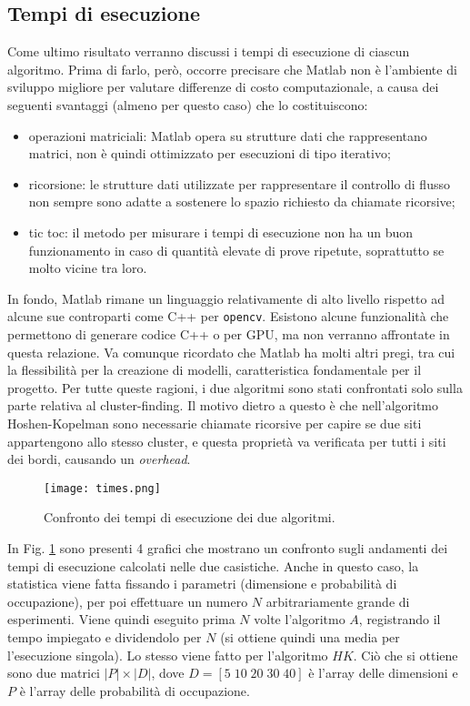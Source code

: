 \subsection*{Tempi di esecuzione}
Come ultimo risultato verranno discussi i tempi di esecuzione di ciascun algoritmo.
Prima di farlo, però, occorre precisare che Matlab non è l'ambiente di sviluppo migliore per valutare 
differenze di costo computazionale, a causa dei seguenti svantaggi (almeno per questo caso) che lo costituiscono:
\begin{itemize}
    \item operazioni matriciali: Matlab opera su strutture dati che rappresentano matrici,
        non è quindi ottimizzato per esecuzioni di tipo iterativo;
    \item ricorsione: le strutture dati utilizzate per 
        rappresentare il controllo di flusso non sempre sono adatte a sostenere lo spazio 
        richiesto da chiamate ricorsive;
    \item tic toc: il metodo per misurare i tempi di esecuzione non ha un buon funzionamento 
        in caso di quantità elevate di prove ripetute, soprattutto se molto vicine tra loro.
\end{itemize}
In fondo, Matlab rimane un linguaggio relativamente di alto livello rispetto 
ad alcune sue controparti come C++ per \texttt{opencv}.
Esistono alcune funzionalità che permettono di generare codice C++ o per GPU, ma non verranno affrontate in questa relazione.
Va comunque ricordato che Matlab ha molti altri pregi, tra cui la flessibilità
per la creazione di modelli, caratteristica fondamentale per il progetto.
Per tutte queste ragioni, i due algoritmi sono stati confrontati solo sulla parte 
relativa al cluster-finding. Il motivo dietro a questo è che nell'algoritmo Hoshen-Kopelman sono 
necessarie chiamate ricorsive per capire se due siti appartengono allo stesso cluster, e questa 
proprietà va verificata per tutti i siti dei bordi, causando un \textit{overhead}.
\begin{figure}[ht]
    \texttt{[image: times.png]}
    \caption{Confronto dei tempi di esecuzione dei due algoritmi.}
    \label{fig:times}
\end{figure}

In Fig. \ref{fig:times} sono presenti 4 grafici che mostrano un confronto sugli andamenti dei 
tempi di esecuzione calcolati nelle due casistiche.
Anche in questo caso, la statistica viene fatta fissando i parametri (dimensione e probabilità di occupazione),
per poi effettuare un numero $N$ arbitrariamente grande di esperimenti.
Viene quindi eseguito prima $N$ volte l'algoritmo $A$, registrando il tempo impiegato e dividendolo per $N$
(si ottiene quindi una media per l'esecuzione singola).
Lo stesso viene fatto per l'algoritmo $HK$. Ciò che si ottiene sono due matrici $|P| \times |D|$, 
dove $D=[5 \; 10 \; 20 \; 30 \; 40]$ è l'array delle dimensioni e $P$ è l'array delle probabilità di 
occupazione.

